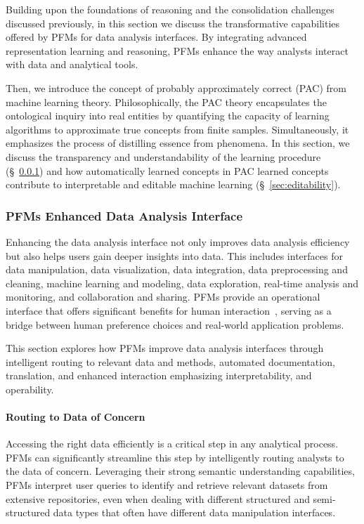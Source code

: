 Building upon the foundations of reasoning and the consolidation challenges discussed previously, in this section we discuss the transformative capabilities offered by PFMs for data analysis interfaces. By integrating advanced representation learning and reasoning, PFMs enhance the way analysts interact with data and analytical tools. 

Then, we introduce the concept of probably approximately correct (PAC) from machine learning theory. Philosophically, the PAC theory encapsulates the ontological inquiry into real entities by quantifying the capacity of learning algorithms to approximate true concepts from finite samples. Simultaneously, it emphasizes the process of distilling essence from phenomena. In this section, we discuss the transparency and understandability of the learning procedure (\S~\ref{sec:interface})  and how automatically learned concepts in PAC learned concepts contribute to interpretable and editable machine learning (\S~\ref{sec:editability}).

\subsubsection{PFMs Enhanced Data Analysis Interface}\label{sec:interface}

Enhancing the data analysis interface not only improves data analysis efficiency but also helps users gain deeper insights into data. This includes interfaces for data manipulation, data visualization, data integration, data preprocessing and cleaning, machine learning and modeling, data exploration, real-time analysis and monitoring, and collaboration and sharing. PFMs provide an operational interface that offers significant benefits for human interaction~\cite{dubiel2024device}, serving as a bridge between human preference choices and real-world application problems.

This section explores how PFMs improve data analysis interfaces through intelligent routing to relevant data and methods, automated documentation, translation, and enhanced interaction emphasizing interpretability,  and operability.

\paragraph{Routing to Data of Concern}

Accessing the right data efficiently is a critical step in any analytical process. PFMs can significantly streamline this step by intelligently routing analysts to the data of concern. Leveraging their strong semantic understanding capabilities, PFMs interpret user queries to identify and retrieve relevant datasets from extensive repositories, even when dealing with different structured and semi-structured data types that often have different data manipulation interfaces.

